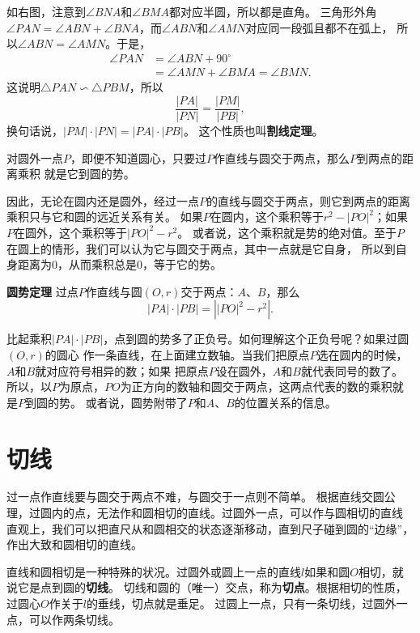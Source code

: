 \documentclass[12pt,UTF8,fontset=none]{ctexbook}
\begin{document}
如右图，注意到$\angle BNA$和$\angle BMA$都对应半圆，所以都是直角。
三角形外角$\angle PAN = \angle ABN + \angle BNA$，而$\angle ABN$和$\angle AMN$对应同一段弧且都不在弧上，
所以$\angle ABN = \angle AMN$。于是，
\begin{align*}
    \angle PAN &= \angle ABN + 90^\circ  \\
    &= \angle AMN + \angle BMA =\angle BMN. 
\end{align*}
这说明$\triangle PAN \backsim \triangle PBM$，所以
$$ \frac{|PA|}{|PN|} = \frac{|PM|}{|PB|},$$
换句话说，$|PM|\cdot |PN| = |PA|\cdot |PB|$。
这个性质也叫\textbf{割线定理}。

对圆外一点$P$，即便不知道圆心，只要过$P$作直线与圆交于两点，那么$P$到两点的距离乘积
就是它到圆的势。

因此，无论在圆内还是圆外，经过一点$P$的直线与圆交于两点，则它到两点的距离乘积只与它和圆的远近关系有关。
如果$P$在圆内，这个乘积等于$r^2 - |PO|^2$；如果$P$在圆外，这个乘积等于$|PO|^2 - r^2$。
或者说，这个乘积就是势的绝对值。至于$P$在圆上的情形，我们可以认为它与圆交于两点，其中一点就是它自身，
所以到自身距离为$0$，从而乘积总是$0$，等于它的势。

\begin{tm}\textbf{圆势定理}\label{tm:0-3-40}
    过点$P$作直线与圆$(O, r)$交于两点：$A$、$B$，那么
    $$ |PA| \cdot |PB| = \left||PO|^2 - r^2\right|. $$
\end{tm}

比起乘积$|PA| \cdot |PB|$，点到圆的势多了正负号。如何理解这个正负号呢？如果过圆$(O,r)$的圆心
作一条直线，在上面建立数轴。当我们把原点$P$选在圆内的时候，$A$和$B$就对应符号相异的数；如果
把原点$P$设在圆外，$A$和$B$就代表同号的数了。
所以，以$P$为原点，$PO$为正方向的数轴和圆交于两点，这两点代表的数的乘积就是$P$到圆的势。
或者说，圆势附带了$P$和$A$、$B$的位置关系的信息。


\section{切线}
过一点作直线要与圆交于两点不难，与圆交于一点则不简单。
根据直线交圆公理，过圆内的点，无法作和圆相切的直线。过圆外一点，可以作与圆相切的直线
直观上，我们可以把直尺从和圆相交的状态逐渐移动，直到尺子碰到圆的“边缘”，作出大致和圆相切的直线。

直线和圆相切是一种特殊的状况。过圆外或圆上一点的直线$l$如果和圆$O$相切，就说它是点到圆的\textbf{切线}。
切线和圆的（唯一）交点，称为\textbf{切点}。根据相切的性质，过圆心$O$作关于$l$的垂线，切点就是垂足。
过圆上一点，只有一条切线，过圆外一点，可以作两条切线。
\end{document}
